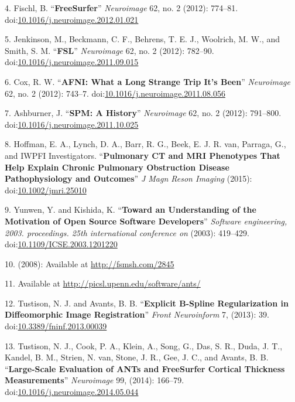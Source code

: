 \documentclass[11pt,]{article}
\begin{document}
\hypertarget{ref-Fischl:2012aa}{}
4. Fischl, B. ``\textbf{FreeSurfer}'' \emph{Neuroimage} 62, no. 2
(2012): 774--81.
doi:\href{https://doi.org/10.1016/j.neuroimage.2012.01.021}{10.1016/j.neuroimage.2012.01.021}

\hypertarget{ref-Jenkinson:2012aa}{}
5. Jenkinson, M., Beckmann, C. F., Behrens, T. E. J., Woolrich, M. W.,
and Smith, S. M. ``\textbf{FSL}'' \emph{Neuroimage} 62, no. 2 (2012):
782--90.
doi:\href{https://doi.org/10.1016/j.neuroimage.2011.09.015}{10.1016/j.neuroimage.2011.09.015}

\hypertarget{ref-Cox:2012aa}{}
6. Cox, R. W. ``\textbf{AFNI: What a Long Strange Trip It's Been}''
\emph{Neuroimage} 62, no. 2 (2012): 743--7.
doi:\href{https://doi.org/10.1016/j.neuroimage.2011.08.056}{10.1016/j.neuroimage.2011.08.056}

\hypertarget{ref-Ashburner:2012aa}{}
7. Ashburner, J. ``\textbf{SPM: A History}'' \emph{Neuroimage} 62, no. 2
(2012): 791--800.
doi:\href{https://doi.org/10.1016/j.neuroimage.2011.10.025}{10.1016/j.neuroimage.2011.10.025}

\hypertarget{ref-Hoffman:2015aa}{}
8. Hoffman, E. A., Lynch, D. A., Barr, R. G., Beek, E. J. R. van,
Parraga, G., and IWPFI Investigators. ``\textbf{Pulmonary CT and MRI
Phenotypes That Help Explain Chronic Pulmonary Obstruction Disease
Pathophysiology and Outcomes}'' \emph{J Magn Reson Imaging} (2015):
doi:\href{https://doi.org/10.1002/jmri.25010}{10.1002/jmri.25010}

\hypertarget{ref-Yunwen:2003aa}{}
9. Yunwen, Y. and Kishida, K. ``\textbf{Toward an Understanding of the
Motivation of Open Source Software Developers}'' \emph{Software
engineering, 2003. proceedings. 25th international conference on}
(2003): 419--429.
doi:\href{https://doi.org/10.1109/ICSE.2003.1201220}{10.1109/ICSE.2003.1201220}

\hypertarget{ref-Rothwell:2008aa}{}
10. (2008): Available at \url{http://fsmsh.com/2845}

\hypertarget{ref-ANTsWebsite}{}
11. Available at \url{http://picsl.upenn.edu/software/ants/}

\hypertarget{ref-Tustison:2013ac}{}
12. Tustison, N. J. and Avants, B. B. ``\textbf{Explicit B-Spline
Regularization in Diffeomorphic Image Registration}'' \emph{Front
Neuroinform} 7, (2013): 39.
doi:\href{https://doi.org/10.3389/fninf.2013.00039}{10.3389/fninf.2013.00039}

\hypertarget{ref-Tustison:2014ab}{}
13. Tustison, N. J., Cook, P. A., Klein, A., Song, G., Das, S. R., Duda,
J. T., Kandel, B. M., Strien, N. van, Stone, J. R., Gee, J. C., and
Avants, B. B. ``\textbf{Large-Scale Evaluation of ANTs and FreeSurfer
Cortical Thickness Measurements}'' \emph{Neuroimage} 99, (2014):
166--79.
doi:\href{https://doi.org/10.1016/j.neuroimage.2014.05.044}{10.1016/j.neuroimage.2014.05.044}
\end{document}
